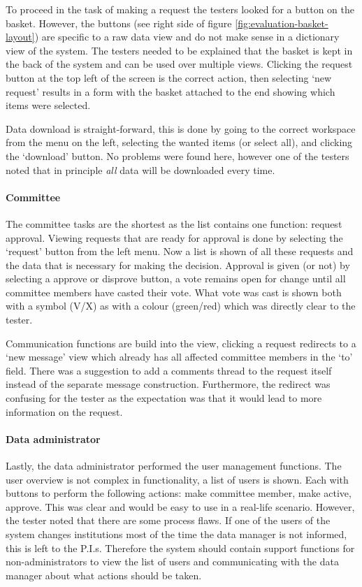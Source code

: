 To proceed in the task of making a request the testers looked for a button on the basket.
However, the buttons (see right side of figure \ref{fig:evaluation-basket-layout}) are specific to a raw data view and do not make sense in a dictionary view of the system.
The testers needed to be explained that the basket is kept in the back of the system and can be used over multiple views.
Clicking the request button at the top left of the screen is the correct action, then selecting `new request' results in a form with the basket attached to the end showing which items were selected.

Data download is straight-forward, this is done by going to the correct workspace from the menu on the left, selecting the wanted items (or select all), and clicking the `download' button.
No problems were found here, however one of the testers noted that in principle \emph{all} data will be downloaded every time.

\paragraph{Committee}
The committee tasks are the shortest as the list contains one function: request approval.
Viewing requests that are ready for approval is done by selecting the `request' button from the left menu.
Now a list is shown of all these requests and the data that is necessary for making the decision.
Approval is given (or not) by selecting a approve or disprove button, a vote remains open for change until all committee members have casted their vote.
What vote was cast is shown both with a symbol (V/X) as with a colour (green/red) which was directly clear to the tester.

Communication functions are build into the view, clicking a request redirects to a `new message' view which already has all affected committee members in the `to' field.
There was a suggestion to add a comments thread to the request itself instead of the separate message construction.
Furthermore, the redirect was confusing for the tester as the expectation was that it would lead to more information on the request.

\paragraph{Data administrator}
Lastly, the data administrator performed the user management functions.
The user overview is not complex in functionality, a list of users is shown.
Each with buttons to perform the following actions: make committee member, make active, approve.
This was clear and would be easy to use in a real-life scenario.
However, the tester noted that there are some process flaws.
If one of the users of the system changes institutions most of the time the data manager is not informed, this is left to the P.I.s.
Therefore the system should contain support functions for non-administrators to view the list of users and communicating with the data manager about what actions should be taken.